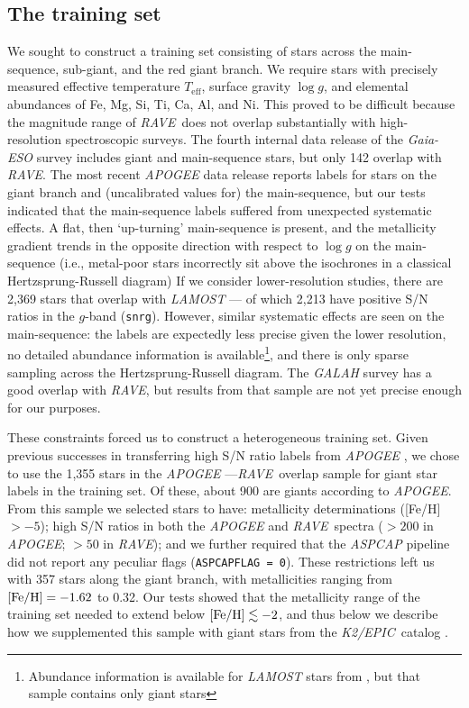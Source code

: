 \documentclass[preprint,trackchanges]{aastex}
\newcommand{\acronym}[1]{{\small{#1}}}
\newcommand{\project}[1]{\textsl{#1}}
\newcommand{\rave}{\project{\acronym{RAVE}}}
\newcommand{\epic}{\project{K2/EPIC}}
\newcommand{\teff}{T_{\mathrm{eff}}}
\newcommand{\logg}{\log g}
\begin{document}
\subsection{The training set}
\label{sec:the-training-set}

We sought to construct a training set consisting of stars across the main-sequence,
sub-giant, and the red giant branch.  We require stars with precisely measured
effective temperature $\teff$, surface gravity $\logg$, and elemental abundances
of Fe, Mg, Si, Ti, Ca, Al, and Ni.  This proved to be difficult because the magnitude
range of \rave\ does not overlap substantially with high-resolution spectroscopic
surveys.  The fourth internal data release of the \project{Gaia-ESO} survey includes 
giant and main-sequence stars, but only 142 overlap with \rave.  The most recent 
\project{APOGEE} data release \citep{sloan_dr13} reports labels for stars on the
giant branch and (uncalibrated values for) the main-sequence, but our tests indicated
that the main-sequence labels suffered from unexpected systematic effects.  A flat, 
then `up-turning' main-sequence is present, and the metallicity gradient trends in 
the opposite direction with respect to $\logg$ on the main-sequence (i.e., metal-poor
stars incorrectly sit above the isochrones in a classical Hertzsprung-Russell diagram)
If we consider lower-resolution studies, there are 2,369 stars that overlap with 
\project{LAMOST} --- of which 2,213 have positive S/N ratios in the $g$-band 
(\texttt{snrg}).  However, similar systematic effects are seen on the main-sequence: 
the labels are expectedly less precise given the lower resolution, no detailed 
abundance information is available\footnote{Abundance information is available for 
\project{LAMOST} stars from \citet{Ho_2016}, but that sample contains only giant stars},
and there is only sparse sampling across the Hertzsprung-Russell diagram.  The 
\project{GALAH} survey has a good overlap with \rave, but results from that sample 
are not yet precise enough for our purposes.


These constraints forced us to construct a heterogeneous training set.  Given previous
successes in transferring high S/N ratio labels from \project{APOGEE} \citep{Ness_2015,
Ness_2016,Ho_2016,Casey_2016b}, we chose to use the 1,355 stars in the \project{APOGEE}
---\rave\ overlap sample for giant star labels in the training set.  Of these, about
900 are giants according to \project{APOGEE}.  From this sample we selected stars to
have: metallicity determinations ([Fe/H] $> -5$); high S/N ratios in both the 
\project{APOGEE} and \rave\ spectra ($>200$ in \project{APOGEE}; $>50$ in \rave); and
we further required that the \project{ASPCAP} pipeline did not report any peculiar
flags (\texttt{ASPCAPFLAG = 0}).  These restrictions left us with 357 stars along the
giant branch, with metallicities ranging from $[{\rm Fe/H}] = -1.62$ to 0.32.  Our tests
showed that the metallicity range of the training set needed to extend below
$[{\rm Fe/H}] \lesssim -2$, and thus below we describe how we supplemented this
sample with giant stars from the \epic\ catalog \citep{Huber_2016}. 
\end{document}
